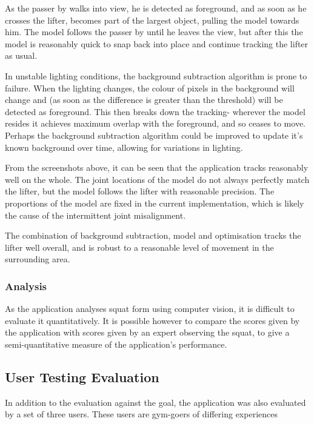 As the passer by walks into view, he is detected as foreground, and as soon as he crosses the lifter, becomes part of the largest object, pulling the model towards him. The model follows the passer by until he leaves the view, but after this the model is reasonably quick to snap back into place and continue tracking the lifter as usual.

In unstable lighting conditions, the background subtraction algorithm is prone to failure. When the lighting changes, the colour of pixels in the background will change and (as soon as the difference is greater than the threshold) will be detected as foreground. This then breaks down the tracking- wherever the model resides it achieves maximum overlap with the foreground, and so ceases to move. Perhaps the background subtraction algorithm could be improved to update it's known background over time, allowing for variations in lighting.

From the screenshots above, it can be seen that the application tracks reasonably well on the whole. The joint locations of the model do not always perfectly match the lifter, but the model follows the lifter with reasonable precision. The proportions of the model are fixed in the current implementation, which is likely the cause of the intermittent joint misalignment.

The combination of background subtraction, model and optimisation tracks the lifter well overall, and is robust to a reasonable level of movement in the surrounding area.

\subsubsection{Analysis}

As the application analyses squat form using computer vision, it is difficult to evaluate it quantitatively. It is possible however to compare the scores given by the application with scores given by an expert observing the squat, to give a semi-quantitative measure of the application's performance.



\subsection{User Testing Evaluation}
\label{sec:user_testing}
In addition to the evaluation against the goal, the application was also evaluated by a set of three users. These users are gym-goers of differing experiences

